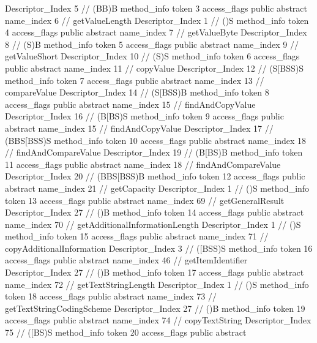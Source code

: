 {{{{{					Descriptor_Index	5		// (BB)B
				}
				method_info {
					token	3
					access_flags	public abstract
					name_index	6		// getValueLength
					Descriptor_Index	1		// ()S
				}
				method_info {
					token	4
					access_flags	public abstract
					name_index	7		// getValueByte
					Descriptor_Index	8		// (S)B
				}
				method_info {
					token	5
					access_flags	public abstract
					name_index	9		// getValueShort
					Descriptor_Index	10		// (S)S
				}
				method_info {
					token	6
					access_flags	public abstract
					name_index	11		// copyValue
					Descriptor_Index	12		// (S[BSS)S
				}
				method_info {
					token	7
					access_flags	public abstract
					name_index	13		// compareValue
					Descriptor_Index	14		// (S[BSS)B
				}
				method_info {
					token	8
					access_flags	public abstract
					name_index	15		// findAndCopyValue
					Descriptor_Index	16		// (B[BS)S
				}
				method_info {
					token	9
					access_flags	public abstract
					name_index	15		// findAndCopyValue
					Descriptor_Index	17		// (BBS[BSS)S
				}
				method_info {
					token	10
					access_flags	public abstract
					name_index	18		// findAndCompareValue
					Descriptor_Index	19		// (B[BS)B
				}
				method_info {
					token	11
					access_flags	public abstract
					name_index	18		// findAndCompareValue
					Descriptor_Index	20		// (BBS[BSS)B
				}
				method_info {
					token	12
					access_flags	public abstract
					name_index	21		// getCapacity
					Descriptor_Index	1		// ()S
				}
				method_info {
					token	13
					access_flags	public abstract
					name_index	69		// getGeneralResult
					Descriptor_Index	27		// ()B
				}
				method_info {
					token	14
					access_flags	public abstract
					name_index	70		// getAdditionalInformationLength
					Descriptor_Index	1		// ()S
				}
				method_info {
					token	15
					access_flags	public abstract
					name_index	71		// copyAdditionalInformation
					Descriptor_Index	3		// ([BSS)S
				}
				method_info {
					token	16
					access_flags	public abstract
					name_index	46		// getItemIdentifier
					Descriptor_Index	27		// ()B
				}
				method_info {
					token	17
					access_flags	public abstract
					name_index	72		// getTextStringLength
					Descriptor_Index	1		// ()S
				}
				method_info {
					token	18
					access_flags	public abstract
					name_index	73		// getTextStringCodingScheme
					Descriptor_Index	27		// ()B
				}
				method_info {
					token	19
					access_flags	public abstract
					name_index	74		// copyTextString
					Descriptor_Index	75		// ([BS)S
				}
				method_info {
					token	20
					access_flags	public abstract
}}}}}
